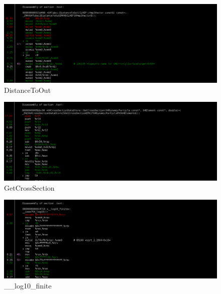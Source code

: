 \documentclass[a4paper]{jpconf}
\begin{document}
\begin{appendices}
\begin{figure}[H]
\begin{center}
\includegraphics[scale=0.33]{images/DistanceToOut_P8.png}
\caption{DistanceToOut}
\end{center}
\end{figure}

\begin{figure}[H]
\begin{center}
\includegraphics[scale=0.33]{images/GetCrossSection_P8.png}
\caption{GetCrossSection}
\end{center}
\end{figure}

\begin{figure}[H]
\begin{center}
\includegraphics[scale=0.33]{images/__log10_finite_P8.png}
\caption{\_\_log10\_finite}
\end{center}
\end{figure}


\end{appendices}
%
%
\end{document}
